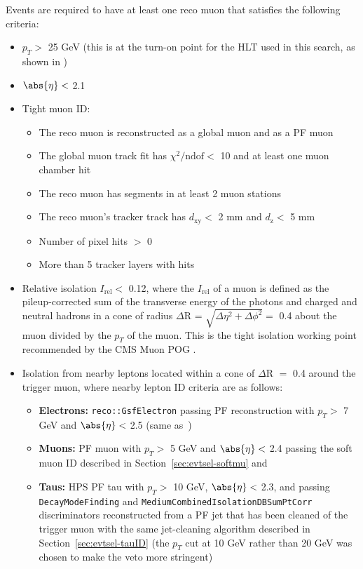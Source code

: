 Events are required to have at least one reco muon that satisfies the following criteria:
\begin{itemize}
	\item $p_T >$ 25 GeV (this is at the turn-on point for the HLT used in this search, as shown in \cite{CMS:muonhlttwiki})
	\item $\abs{\eta} <$ 2.1
	\item Tight muon ID:
	\begin{itemize}
		\item The reco muon is reconstructed as a global muon and as a PF muon
		\item The global muon track fit has $\chi^{2}/\text{ndof} <$ 10 and at least one muon chamber hit 
		\item The reco muon has segments in at least 2 muon stations
		\item The reco muon's tracker track has $d_{\text{xy}} <$ 2 mm and $d_{\text{z}} <$ 5 mm
		\item Number of pixel hits $>$ 0
		\item More than 5 tracker layers with hits
	\end{itemize}
	\item Relative isolation $I_{\text{rel}} <$ 0.12, where the $I_{\text{rel}}$ of a muon is defined as the pileup-corrected sum of the transverse energy of the photons and charged and neutral hadrons in a cone of radius $\Delta$R = $\sqrt{\Delta\eta^{2} + \Delta\phi^{2}} =$ 0.4 about the muon divided by the $p_T$ of the muon. This is the tight isolation working point recommended by the CMS Muon POG \cite{CMS:muonidtwiki}.
        \item Isolation from nearby leptons located within a cone of $\Delta$R $=$ 0.4 around the trigger muon, where nearby lepton ID criteria are as follows:
          \begin{itemize}
          \item \textbf{Electrons:} \texttt{reco::GsfElectron} passing PF reconstruction with $p_T >$ 7 GeV and $\abs{\eta} <$ 2.5 (same as~\cite{Chatrchyan:2013mxa})
          \item \textbf{Muons:} PF muon with $p_T >$ 5 GeV and $\abs{\eta} <$ 2.4 passing the soft muon ID described in Section~\ref{sec:evtsel-softmu} and~\cite{CMS:2010uta}
          \item \textbf{Taus:} HPS PF tau with $p_T >$ 10 GeV, $\abs{\eta} <$ 2.3, and passing \texttt{DecayModeFinding} and \texttt{MediumCombinedIsolationDBSumPtCorr} discriminators reconstructed from a PF jet that has been cleaned of the trigger muon with the same jet-cleaning algorithm described in Section~\ref{sec:evtsel-tauID} (the $p_T$ cut at 10 GeV rather than 20 GeV was chosen to make the veto more stringent)
          \end{itemize}
\end{itemize}

